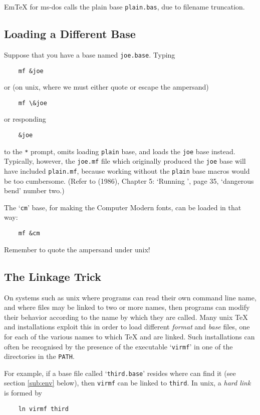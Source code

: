 Em\TeX{} for {\sc ms-dos} calls the plain base {\tt plain.bas},
due to filename truncation.


\subsection{Loading a Different Base}\label{sub:loading}

Suppose that you have a base named {\tt joe.base}.
Typing
\begin{verbatim}
    mf &joe
\end{verbatim}
or (on unix, where we must either quote or escape the ampersand)
\begin{verbatim}
    mf \&joe
\end{verbatim}
or responding
\begin{verbatim}
    &joe
\end{verbatim}
to the {\tt **} prompt,
omits loading {\tt plain} base, and loads the {\tt joe} base instead.
Typically, however, the {\tt joe.mf} file which originally produced
the {\tt joe} base will have included {\tt plain.mf}, because working
without the {\tt plain} base macros would be too cumbersome.
(Refer to \MFbook{} (1986), Chapter 5: `Running \MF{}', page 35,
`dangerous bend' number two.)

The `{\tt cm}' base, for making the {\sc Computer Modern} fonts,
can be loaded in that way:
\begin{verbatim}
    mf &cm
\end{verbatim}
Remember to quote the ampersand under {\sc unix}!


\subsection{The Linkage Trick}\label{sub:link}

On systems such as {\sc unix} where programs can read their own
command line name, and where files may be linked to two or more
names, then programs can modify their behavior according to the
name by which they are called.  Many {\sc unix} \TeX{} and \MF{}
installations exploit this in order to load different {\em format\/}
and {\em base\/} files, one for each of the various names to which
\TeX{} and \MF{} are linked.  Such installations can often
be recognised by the presence of the executable `{\tt virmf}'
in one of the directories in the {\tt PATH}.

For example, if a base file called `{\tt third.base}' resides where
\MF{} can find it (see section \ref{sub:env} below), then
{\tt virmf} can be linked to {\tt third}.
In {\sc unix}, a {\em hard link\/} is formed by
\begin{verbatim}
    ln virmf third
\end{verbatim}

